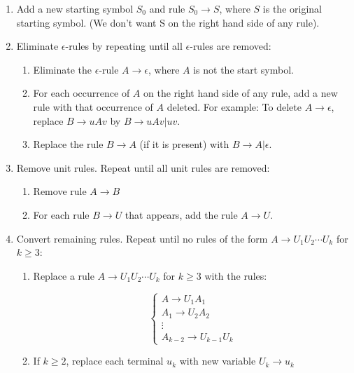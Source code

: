 \documentclass{article}
\begin{document}
\begin{enumerate}
\item Add a new starting symbol $S_0$ and rule $S_0\rightarrow{}S$,
  where $S$ is the original starting symbol. (We don't want S on the
  right hand side of any rule).

\item Eliminate $\epsilon$-rules by repeating until all $\epsilon$-rules are removed:
  \begin{enumerate}[label=(\alph*)]
    \item Eliminate the $\epsilon$-rule $A\rightarrow\epsilon$, where
      $A$ is not the start symbol.

    \item For each occurrence of $A$ on the right hand side of any
      rule, add a new rule with that occurrence of $A$ deleted. For
      example: To delete $A\rightarrow\epsilon$, replace
      $B\rightarrow{}uAv$ by $B\rightarrow{}uAv|uv$.

    \item Replace the rule $B\rightarrow{}A$ (if it is present) with
      $B\rightarrow{}A|\epsilon$.
  \end{enumerate}

\item Remove unit rules. Repeat until all unit rules are removed:
  \begin{enumerate}[label=(\alph*)]
  \item Remove rule $A\rightarrow{}B$

  \item For each rule $B\rightarrow{}U$ that appears, add the rule
    $A\rightarrow{}U$.
  \end{enumerate}

\item Convert remaining rules. Repeat until no rules of the form
  $A\rightarrow{}U_1U_2\cdots{}U_k$ for $k\ge3$:

  \begin{enumerate}[label=(\alph*)]
  \item Replace a rule $A\rightarrow{}U_1U_2\cdots{}U_k$ for $k\ge3$
    with the rules:

    \[\begin{cases}
      A\rightarrow U_1A_1 \\ A_1\rightarrow{}U_2A_2 \\ \vdots \\ A_{k-2}\rightarrow{}U_{k-1}U_{k}
    \end{cases}\]

  \item If $k\ge2$, replace each terminal $u_k$ with new variable
    $U_k\rightarrow{}u_k$
  \end{enumerate}
\end{enumerate}
\end{document}
